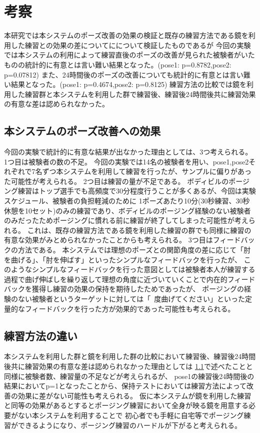 \chapter{考察}
\label{consideration}
本研究では本システムのポーズ改善の効果の検証と既存の練習方法である鏡を利用した練習との効果の差についてにについて検証したものであるが
今回の実験では本システムの利用によって練習直後のポーズの改善が見られた被験者がいたものの統計的に有意とは言い難い結果となった。(pose1: p=0.8782,pose2: p=0.07812)
また、24時間後のポーズの改善についても統計的に有意とは言い難い結果となった。(pose1: p=0.4674,pose2: p=0.8125)
練習方法の比較では鏡を利用した練習群と本システムを利用した群で練習後、練習後24時間後共に練習効果の有意な差は認められなかった。

\section{本システムのポーズ改善への効果}
\label{sec:pose_improvement_from_system}
今回の実験で統計的に有意な結果が出なかった理由としては、3つ考えられる。
1つ目は被験者の数の不足。
今回の実験では14名の被験者を用い、pose1,pose2それぞれで7名ずつ本システムを利用して練習を行ったが、サンプルに偏りがあった可能性が考えられる。
2つ目は練習の量が不足である。
ボディビルのポージング練習はトップ選手でも高頻度で30分程度行うことが多くあるが、今回は実験スケジュール、被験者の負担軽減のために
1ポーズあたり10分(30秒練習、30秒休憩を10セット)のみの練習であり、ボディビルのポージング経験のない被験者のみだったためポージングに慣れる前に練習が終了してしまった可能性が考えられる。
これは、既存の練習方法である鏡を利用した練習の群でも同様に練習の有意な効果がみとめられなかったことからも考えられる。
3つ目はフィードバックの方法である。
本システムでは理想のポーズとの関節角度の差に応じて「肘を曲げる」、「肘を伸ばす」といったシンプルなフィードバックを行ったが、
このようなシンプルなフィードバックを行った意図としては被験者本人が練習する過程で曲げ伸ばしを繰り返して理想の角度に近づいていくことで内在的フィードバックを獲得し練習の効果の保持を期待したためであったが、
ポージングの経験のない被験者というターゲットに対しては「~度曲げてください」といった定量的なフィードバックを行った方が効果的であった可能性も考えられる。

\section{練習方法の違い}
本システムを利用した群と鏡を利用した群の比較において練習後、練習後24時間後共に練習効果の有意な差は認められなかった理由としては
\ref{sec:pose_improvement_from_system}で述べたことと同様に被験者数、練習量の不足などが考えられるが、
pose1の練習後24時間後の結果においてp=1となったことから、保持テストにおいては練習方法によって改善の効果に差がない可能性も考えられる。
仮に本システムが鏡を利用した練習と同等の効果があるとするとポージング練習において全身が映る鏡を用意する必要がない本システムを利用することで
初心者でも手軽に自宅等でポージング練習ができるようになり、ポージング練習のハードルが下がると考えられる。